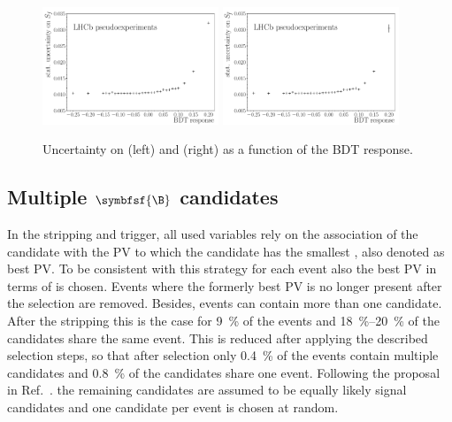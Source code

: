 \begin{figure}[tbp]
    \centering
    \includegraphics[width=0.47\textwidth]{07selection/figs/sensitiv_Sf.pdf}
    \includegraphics[width=0.47\textwidth]{07selection/figs/sensitiv_Sfbar.pdf}
    \caption{Uncertainty on \Sf (left) and \Sfbar (right) as a function of the \ac{BDT} response.}
    \label{fig:BDTopt}
\end{figure}

\subsection[head={Multiple \B candidates},tocentry={Multiple \B candidates}]{Multiple $\symbfsf{\B}$ candidates}
\label{sec:MultCands}

In the stripping and trigger, all used variables rely on the association of the \Bz candidate with the \ac{PV} to which the candidate has the smallest \chisqip, also denoted as best \ac{PV}.
To be consistent with this strategy for each event also the best \ac{PV} in terms of \chisqip is chosen.
Events where the formerly best \ac{PV} is no longer present after the selection are removed.
Besides, events can contain more than one \Bz candidate.
After the stripping this is the case for \SI{9}{\percent} of the events and \SIrange{18}{20}{\percent} of the \Bz candidates share the same event.
This is reduced after applying the described selection steps, so that after selection only \SI{0.4}{\percent} of the events contain multiple candidates and \SI{0.8}{\percent} of the \Bz candidates share one event.
Following the proposal in Ref.~\cite{Koppenburg:2017zsh}. the remaining candidates are assumed to be equally likely signal candidates and one candidate per event is chosen at random.

